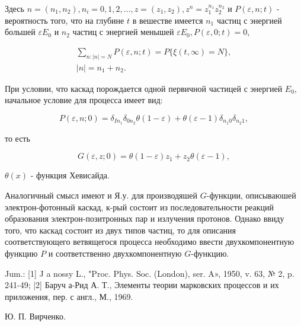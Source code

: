 \documentclass[10pt]{article}
\begin{document}
Здесь $n=\left(n_{1}, n_{2}\right), n_{i}=0,1,2, \ldots, z=\left(z_{1}, z_{2}\right), z^{n}=z_{1}^{n_{1}} z_{2}^{n_{2}}$ и $P(\varepsilon, n ; t)$ - вероятность того, что на глубине $t$ в вешестве имеется $n_{1}$ частиц с энергией большей $\varepsilon E_{0}$ и $n_{2}$ частиц с энергией менышей $\varepsilon E_{0}, P(\varepsilon, 0 ; t)=0$,



\[

\begin{gathered}

\sum_{n:|n|=N} P(\varepsilon, n ; t)=P\{\xi(t, \infty)=N\}, \\

|n|=n_{1}+n_{2} .

\end{gathered}

\]



При условии, что каскад порождается одной первичной частицей с энергией $E_{0}$, начальное условие для процесса имеет вид:



\[

P(\varepsilon, n ; 0)=\delta_{I n_{1}} \delta_{0 n_{2}} \theta(1-\varepsilon)+\theta(\varepsilon-1) \delta_{n_{1} 0} \delta_{n_{2} 1},

\]



то есть



\[

G(\varepsilon, z ; 0)=\theta(1-\varepsilon) z_{1}+z_{2} \theta(\varepsilon-1),

\]



$\theta(x)$ - функция Хевисайда.



Аналогичный смысл имеют и Я.у. для производяшей $G$-функции, описываюшей электрон-фотонный каскад, к-рый состоит из последовательности реакций образования электрон-позитронных пар и излучения протонов. Однако ввиду того, что каскад состоит из двух типов частиц, то для описания соответствующего ветвящегося процесса необходимо ввести двухкомпонентную функцию $P$ и соответственно двухкомпонентную $G$-функцию.



Jum.: [1] J a nossy L., "Proc. Phys. Soc. (London), ser. A», 1950, v. 63, № 2, p. 241-49; |2] Баруч а-Рид А. Т., Элементы теории марковских процессов и их приложения, пер. с англ., М., 1969.



Ю. П. Вирченко.
\end{document}
